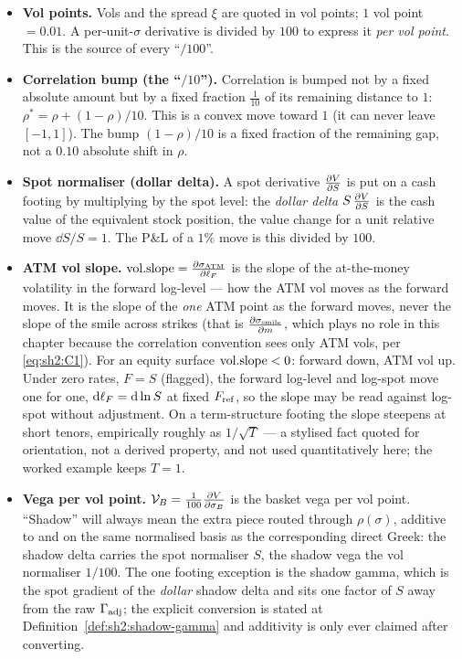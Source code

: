 \begin{itemize}[leftmargin=1.5em]
\item \textbf{Vol points.} Vols and the spread $\xi$ are quoted in vol
  points; $1$ vol point $= 0.01$. A per-unit-$\sigma$ derivative is divided
  by $100$ to express it \emph{per vol point}. This is the source of every
  ``$/100$''.
\item \textbf{Correlation bump (the ``$/10$'').} Correlation is bumped not
  by a fixed absolute amount but by a fixed fraction $\tfrac1{10}$ of its
  remaining distance to $1$:
  $\rho^{*} = \rho + (1 - \rho)/10$. This is a convex move toward $1$ (it
  can never leave $[-1, 1]$). The bump $(1 - \rho)/10$ is a fixed fraction
  of the remaining gap, not a $0.10$ absolute shift in $\rho$.
\item \textbf{Spot normaliser (dollar delta).} A spot derivative
  $\frac{\partial V}{\partial S}$ is put on a cash footing by multiplying by the spot level:
  the \emph{dollar delta} $S\,\frac{\partial V}{\partial S}$ is the cash value of the
  equivalent stock position, the value change for a unit relative move
  $\dd S / S = 1$. The P\&L of a $1\%$ move is this divided by $100$.
\item \textbf{ATM vol slope.} $\mathrm{vol.slope} = \frac{\partial \sigma_{\mathrm{ATM}}}{\partial \ell_F}$ is the slope
  of the at-the-money volatility in the forward log-level --- how the ATM
  vol moves as the forward moves. It is the slope of the \emph{one} ATM
  point as the forward moves, never the slope of the smile across strikes
  (that is $\frac{\partial \sigma_{\mathrm{smile}}}{\partial m}$, which plays no role in this chapter because
  the correlation convention sees only ATM vols, per \eqref{eq:sh2:C1}).
  For an equity surface $\mathrm{vol.slope} < 0$: forward down, ATM vol up. Under
  zero rates, $F = S$ (flagged), the forward log-level and log-spot move
  one for one, $\mathrm{d} \ell_F = \mathrm{d} \ln S$ at fixed $F_{\mathrm{ref}}$, so the slope may be
  read against log-spot without adjustment. On a term-structure footing
  the slope steepens at short tenors, empirically roughly as $1/\sqrt{T}$
  --- a stylised fact quoted for orientation, not a derived property, and
  not used quantitatively here; the worked example keeps $T = 1$.
\item \textbf{Vega per vol point.} $\mathcal{V}_B = \tfrac1{100} \frac{\partial V}{\partial \sigma_B}$ is the
  basket vega per vol point. ``Shadow'' will always mean the extra piece
  routed through $\rho(\sigma)$, additive to and on the same normalised
  basis as the corresponding direct Greek: the shadow delta carries the
  spot normaliser $S$, the shadow vega the vol normaliser $1/100$. The one
  footing exception is the shadow gamma, which is the spot gradient of the
  \emph{dollar} shadow delta and sits one factor of $S$ away from the raw
  $\Gamma_{\mathrm{adj}}$; the explicit conversion is stated at
  Definition~\ref{def:sh2:shadow-gamma} and additivity is only ever
  claimed after converting.
\end{itemize}

